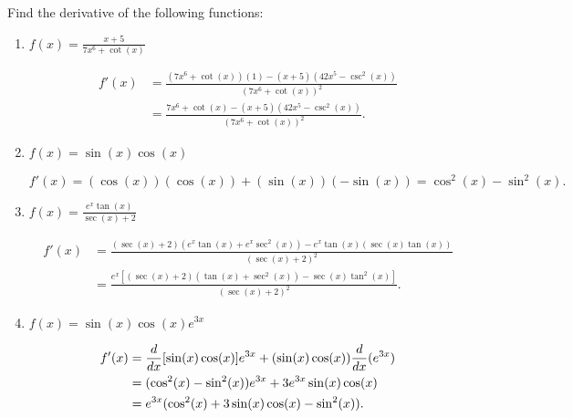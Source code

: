 \documentclass[nooutcomes]{ximera}
\begin{document}
\begin{problem}
Find the derivative of the following functions:

	\begin{enumerate}
	
	\item  $f(x) = \frac{x+5}{7x^6 + \cot(x)}$
			\begin{freeResponse}
			\begin{align*}
			f'(x) &= \frac{(7x^6 + \cot(x))(1) - (x+5)(42x^5 - \csc^2(x))}{(7x^6 + \cot(x))^2}  \\
			&= \frac{7x^6 + \cot(x) - (x+5)(42x^5 - \csc^2(x))}{(7x^6 + \cot(x))^2}.
			\end{align*}
			\end{freeResponse}
			
			
			
	\item  $f(x) = \sin(x) \cos(x)$
			\begin{freeResponse}
			$$f'(x) = (\cos(x))(\cos(x)) + (\sin(x))(-\sin(x)) = \cos^2(x) - \sin^2(x).$$
			\end{freeResponse}
			
			
			
	\item  $f(x) = \frac{e^x \tan(x)}{\sec(x) + 2}$
			\begin{freeResponse}
			\begin{align*}
			f'(x) &= \frac{(\sec(x)+2)(e^x \tan(x) + e^x \sec^2(x)) - e^x \tan(x) (\sec(x) \tan(x))}{(\sec(x) + 2)^2}  \\
			&= \frac{e^x[(\sec(x) + 2)(\tan(x) + \sec^2(x)) - \sec(x) \tan^2(x)]}{(\sec(x) + 2)^2}.
			\end{align*}
			\end{freeResponse}
			
			
			
	\item  $f(x) = \sin(x) \cos(x) e^{3x}$
			\begin{freeResponse}
			\begin{align*}
			f'(x) &= \frac{d}{dx}[\sin(x) \cos(x)] e^{3x} + (\sin(x) \cos(x)) \frac{d}{dx}(e^{3x})  \\
			&= (\cos^2(x) - \sin^2(x))e^{3x} + 3e^{3x} \sin(x) \cos(x)  \\
			&= e^{3x}(\cos^2(x) + 3\sin(x) \cos(x) - \sin^2(x)).
			\end{align*}
			\end{freeResponse}
			
			
			
	\end{enumerate}
		
\end{problem}	
\end{document}
